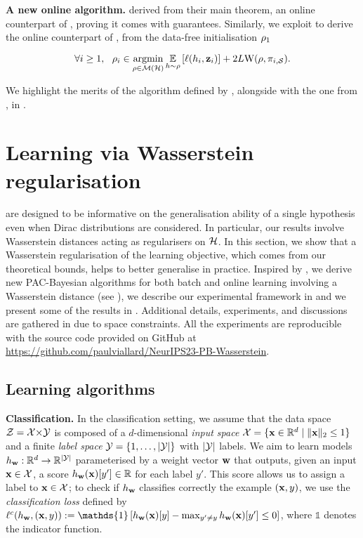 \documentclass{article}
\begin{document}
\textbf{A new online algorithm.}
\cite{haddouche2022online} derived from their main theorem, an online counterpart of , proving it comes with guarantees.
Similarly, we exploit  to derive the online counterpart of , from the data-free initialisation $\rho_1$

\begin{equation}
    \label{eq:online-alg}
    \forall i \geq 1,\ \ \rho_i \in \operatorname*{\mathrm{argmin}}_{\rho\in\mathcal{M}(\mathcal{H})} \operatorname*{\mathbb{E}}_{h\sim \rho}\left[\ell(h_i, \mathbf{z}_i)\right] + 2L\mathrm{W}(\rho, \pi_{i,\mathcal{S}}).
\end{equation}

We highlight the merits of the algorithm defined by , alongside with the one from , in .

\section{Learning via Wasserstein regularisation}
\label{sec:experiments}

 are designed to be informative on the generalisation ability of a single hypothesis even when Dirac distributions are considered.
In particular, our results involve Wasserstein distances acting as regularisers on $\mathcal{H}$. 
In this section, we show that a Wasserstein regularisation of the learning objective, which comes from our theoretical bounds, helps to better generalise in practice.
Inspired by , we derive new PAC-Bayesian algorithms for both batch and online learning involving a Wasserstein distance (see ), we describe our experimental framework in  and we present some of the results in .
Additional details, experiments, and discussions are gathered in  due to space constraints. 
All the experiments are reproducible with the source code provided on GitHub at \url{https://github.com/paulviallard/NeurIPS23-PB-Wasserstein}.

\subsection{Learning algorithms}
\label{sec:algo}

\textbf{Classification.} 
In the classification setting, we assume that the data space $\mathcal{Z}=\mathcal{X}{\times}\mathcal{Y}$ is composed of a $d$-dimensional \textit{input space} $\mathcal{X}=\{ \mathbf{x} \in \mathbb{R}^d \;|\; \|\mathbf{x}\|_2 \le 1 \}$ and a finite \textit{label space} $\mathcal{Y}=\{1,\dots, |\mathcal{Y}|\}$ with $|\mathcal{Y}|$ labels.
We aim to learn models $h_{\mathbf{w}}: \mathbb{R}^d\to \mathbb{R}^{|\mathcal{Y}|}$ parameterised by a weight vector $\mathbf{w}$ that outputs, given an input $\mathbf{x}\in\mathcal{X}$, a score $h_{\mathbf{w}}(\mathbf{x})[y'] \in \mathbb{R}$ for each label $y'$. 
This score allows us to assign a label to $\mathbf{x}\in\mathcal{X}$; to check if $h_{\mathbf{w}}$ classifies correctly the example $(\mathbf{x}, y)$, we use the {\it classification loss} defined by $\loss^{c}(h_{\wbf}, (\x, y)) \defeq \mathds{1}\left[ h_{\wbf}(\x)[y] - \max_{y'\ne y} h_{\wbf}(\x)[y'] \le 0 \right]$, where $\mathds{1}$ denotes the indicator function.
\end{document}
